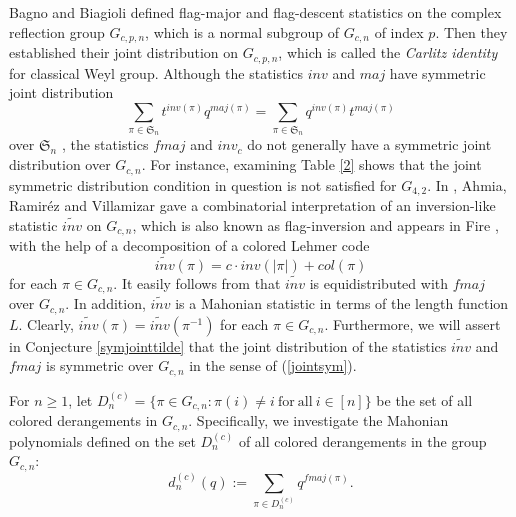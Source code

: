 \documentclass[a4paper,12pt]{article}
\begin{document}
Bagno and Biagioli \cite{bagno2007} defined flag-major and flag-descent statistics on the complex reflection group $G_{c,p,n}$, which is a normal subgroup of $G_{c,n}$ of index $p$. Then they established their joint distribution on $G_{c,p,n}$, which is called the \textit{Carlitz identity} for classical Weyl group. Although the statistics $inv$ and $maj$ have symmetric joint distribution 
\begin{equation} \label{jointsym}
  \sum_{\pi \in \mathfrak{S}_n}t^{inv(\pi)}q^{maj(\pi)}=\sum_{\pi \in \mathfrak{S}_n}q^{inv(\pi)}t^{maj(\pi)}  
\end{equation}
over $\mathfrak{S}_n$ \cite{foata1978}, the statistics $fmaj$ and $inv_c$ do not generally have a symmetric joint distribution over $G_{c,n}$. For instance, examining Table \ref{2} shows that the joint symmetric distribution condition in question is not satisfied for $G_{4,2}$. In \cite{ahmia2025}, Ahmia, Ramir\'ez and Villamizar gave a combinatorial interpretation of an inversion-like statistic $\widetilde{inv}$ on $G_{c,n}$, which is also known as flag-inversion and appears in Fire \cite{fire2005}, with the help of a decomposition of a colored Lehmer code 
\begin{equation} \label{tileinv}
\widetilde{inv}(\pi)=c \cdot inv(|\pi|)+col(\pi)
\end{equation}
for each $\pi \in G_{c,n}$.  It easily follows from \cite{fire2005} that $\widetilde{inv}$ is equidistributed with $fmaj$ over $G_{c,n}$. In addition, $\widetilde{inv}$ is a Mahonian statistic in terms of the length function $L$. Clearly, $\widetilde{inv}(\pi)=\widetilde{inv}(\pi^{-1})$ for each $\pi \in G_{c,n}$. Furthermore, we will assert in Conjecture \ref{symjointtilde} that the joint distribution of the statistics $\widetilde{inv}$ and $fmaj$ is symmetric over $G_{c,n}$ in the sense of (\ref{jointsym}).


For $n \geq 1$, let $D_{n}^{(c)}=\{\pi \in G_{c,n}: \pi(i)\neq i~\textrm{for}~\textrm{all}~i \in [n]\}$ be the set of all colored derangements in $G_{c,n}$. Specifically, we investigate the Mahonian polynomials defined on the set $D_{n}^{(c)}$  of all colored derangements in the group $G_{c,n}$:  
\begin{equation}\label{cfmaj}
   d_n^{(c)}(q):= \sum_{\pi \in D_{n}^{(c)}}q^{fmaj(\pi)}.
\end{equation}
\end{document}
